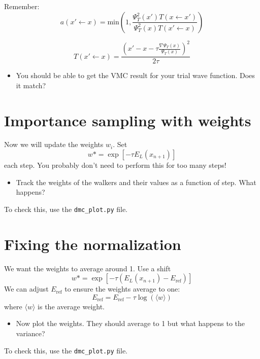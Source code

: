 \documentclass[12pt]{article}
\begin{document}
Remember:
\begin{equation}
	a(x' \leftarrow x) = \text{min}\left(1,\frac{\Psi_T^2(x') T(x \leftarrow x')}{\Psi_T^2(x) T(x' \leftarrow x)} \right)
\end{equation}

\begin{equation}
	T(x'\leftarrow x) = \frac{ \left(x' - x - \tau \frac{\nabla \Psi_T(x)}{\Psi_T(x)}\right)^2}{ 2\tau}
\end{equation}

\begin{itemize}
\item You should be able to get the VMC result for your trial wave function. Does it match? 
\end{itemize}

\section*{Importance sampling with weights}
Now we will update the weights $w_i$. Set 
\begin{equation}
w*=	\exp[-\tau E_L(x_{n+1})] 
\end{equation}
each step.
You probably don't need to perform this for too many steps!

\begin{itemize}
\item Track the weights of the walkers and their values as a function of step. What happens?
\end{itemize}
To check this, use the \texttt{dmc\_plot.py} file.


\section*{Fixing the normalization}

We want the weights to average around 1.
Use a shift 
\begin{equation}
w*=	\exp[-\tau (E_L(x_{n+1})-E_{\text{ref}})] 
\end{equation}
We can adjust $E_{\text {ref}}$ to ensure the weights average to one:
\begin{equation}
E_{\text{ref}}=E_{\text{ref}}-\tau \log(\langle w \rangle) 
\end{equation}
where $\langle w \rangle$ is the average weight. 

\begin{itemize}
\item Now plot the weights. They should average to 1 but what happens to the variance?
\end{itemize}
To check this, use the \texttt{dmc\_plot.py} file.
\end{document}
